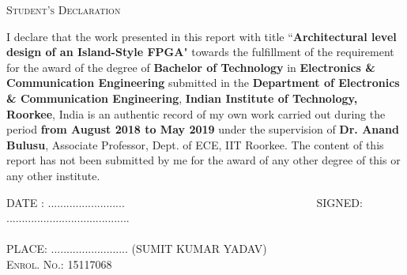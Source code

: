 %
%
%
%
%
%
\noindent \hfill \textsc{\Large Student's Declaration}\\
\noindent\makebox[\linewidth]{\rule{\textwidth}{1pt}} 
\begin{SingleSpacing}
\vspace{-5mm}
I declare that the work presented in this report with title ``\textbf{Architectural level design of an Island-Style FPGA}" towards the fulfillment of the requirement for the award of the degree of \textbf{Bachelor of Technology} in \textbf{Electronics \& Communication Engineering} submitted in the \textbf{Department of Electronics \& Communication Engineering}, \textbf{Indian Institute of Technology, Roorkee}, India is an authentic record of my own work carried out during the period \textbf{from August 2018 to May 2019} under the supervision of \textbf{Dr. Anand Bulusu}, Associate Professor, Dept. of ECE, IIT Roorkee.
\noindent The content of this report has not been submitted by me for the award of any other degree of this or any other institute.

\vspace{3cm}
\noindent
\textsc{DATE : ......................... ~~~~~~~~~~~~~~~~~~~~~~~~~~~~~~~~~~SIGNED: ........................................}\\\\
\textsc{PLACE: .........................}
\nobreak
\hfill \textsc{(SUMIT KUMAR YADAV)} \\
\vspace{-4 mm}
\nobreak
\hfill \textsc{Enrol. No.: 15117068}


\end{SingleSpacing}
\clearpage 
